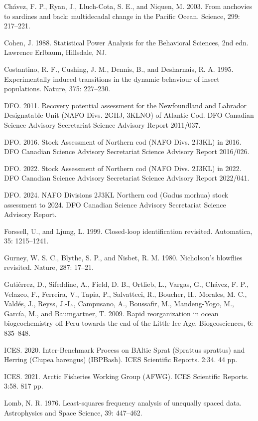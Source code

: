 \documentclass[11pt]{article}
\begin{document}
Ch\'avez, F. P., Ryan, J., Lluch-Cota, S. E., and Niquen, M. 2003. From
anchovies to sardines and back: multidecadal change in the Pacific
Ocean. Science, 299: 217--221.

Cohen, J. 1988. Statistical Power Analysis for the Behavioral Sciences,
2nd edn. Lawrence Erlbaum, Hillsdale, NJ.

Costantino, R. F., Cushing, J. M., Dennis, B., and Desharnais, R. A.
1995. Experimentally induced transitions in the dynamic behaviour of
insect populations. Nature, 375: 227--230.

DFO. 2011. Recovery potential assessment for the Newfoundland and
Labrador Designatable Unit (NAFO Divs. 2GHJ, 3KLNO) of Atlantic Cod. DFO
Canadian Science Advisory Secretariat Science Advisory Report 2011/037.

DFO. 2016. Stock Assessment of Northern cod (NAFO Divs. 2J3KL) in 2016.
DFO Canadian Science Advisory Secretariat Science Advisory Report
2016/026.

DFO. 2022. Stock Assessment of Northern cod (NAFO Divs. 2J3KL) in 2022.
DFO Canadian Science Advisory Secretariat Science Advisory Report
2022/041.

DFO. 2024. NAFO Divisions 2J3KL Northern cod (Gadus morhua) stock
assessment to 2024. DFO Canadian Science Advisory Secretariat Science
Advisory Report.

Forssell, U., and Ljung, L. 1999. Closed-loop identification revisited.
Automatica, 35: 1215--1241.

Gurney, W. S. C., Blythe, S. P., and Nisbet, R. M. 1980. Nicholson's
blowflies revisited. Nature, 287: 17--21.

Guti\'errez, D., Sifeddine, A., Field, D. B., Ortlieb, L., Vargas, G.,
Ch\'avez, F. P., Velazco, F., Ferreira, V., Tapia, P., Salvatteci, R.,
Boucher, H., Morales, M. C., Vald\'es, J., Reyss, J.-L., Campusano, A.,
Boussafir, M., Mandeng-Yogo, M., Garc\'ia, M., and Baumgartner, T. 2009.
Rapid reorganization in ocean biogeochemistry off Peru towards the end
of the Little Ice Age. Biogeosciences, 6: 835--848.

ICES. 2020. Inter-Benchmark Process on BAltic Sprat (Sprattus sprattus)
and Herring (Clupea harengus) (IBPBash). ICES Scientific Reports. 2:34.
44 pp.

ICES. 2021. Arctic Fisheries Working Group (AFWG). ICES Scientific
Reports. 3:58. 817 pp.

Lomb, N. R. 1976. Least-squares frequency analysis of unequally spaced
data. Astrophysics and Space Science, 39: 447--462.
\end{document}
